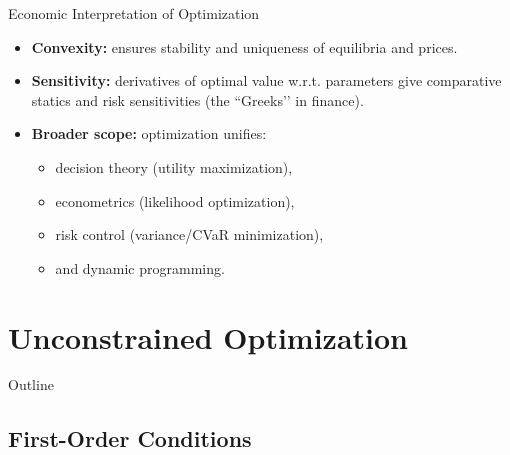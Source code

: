 \documentclass[aspectratio=169]{beamer}
\begin{document}
\begin{frame}{Economic Interpretation of Optimization}

\begin{itemize}
  \item \textbf{Convexity:}  
        ensures stability and uniqueness of equilibria and prices.
\pause
  \item \textbf{Sensitivity:}  
        derivatives of optimal value w.r.t. parameters give comparative statics and risk sensitivities (the “Greeks’’ in finance).
\pause
  \item \textbf{Broader scope:}  
        optimization unifies:
        \begin{itemize}
          \item decision theory (utility maximization),
          \item econometrics (likelihood optimization),
          \item risk control (variance/CVaR minimization),
          \item and dynamic programming.
        \end{itemize}
\end{itemize}

\end{frame}

\section{Unconstrained Optimization}

\begin{frame}{Outline}
\end{frame}

\subsection{First-Order Conditions}
\end{document}
